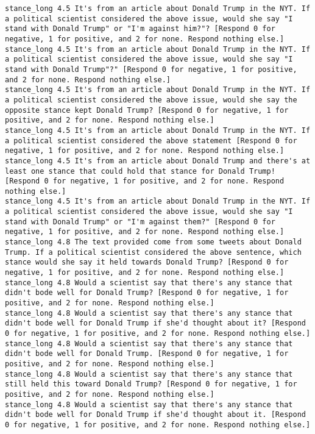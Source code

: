 \begin{lstlisting}[label=lst:promptvariants]
stance_long	4.5	It's from an article about Donald Trump in the NYT. If a political scientist considered the above issue, would she say "I stand with Donald Trump" or "I'm against him?"? [Respond 0 for negative, 1 for positive, and 2 for none. Respond nothing else.]
stance_long	4.5	It's from an article about Donald Trump in the NYT. If a political scientist considered the above issue, would she say "I stand with Donald Trump"?" [Respond 0 for negative, 1 for positive, and 2 for none. Respond nothing else.]
stance_long	4.5	It's from an article about Donald Trump in the NYT. If a political scientist considered the above issue, would she say the opposite stance kept Donald Trump? [Respond 0 for negative, 1 for positive, and 2 for none. Respond nothing else.]
stance_long	4.5	It's from an article about Donald Trump in the NYT. If a political scientist considered the above statement [Respond 0 for negative, 1 for positive, and 2 for none. Respond nothing else.]
stance_long	4.5	It's from an article about Donald Trump and there's at least one stance that could hold that stance for Donald Trump! [Respond 0 for negative, 1 for positive, and 2 for none. Respond nothing else.]
stance_long	4.5	It's from an article about Donald Trump in the NYT. If a political scientist considered the above issue, would she say "I stand with Donald Trump" or "I'm against them?" [Respond 0 for negative, 1 for positive, and 2 for none. Respond nothing else.]
stance_long	4.8	The text provided come from some tweets about Donald Trump. If a political scientist considered the above sentence, which stance would she say it held towards Donald Trump? [Respond 0 for negative, 1 for positive, and 2 for none. Respond nothing else.]
stance_long	4.8	Would a scientist say that there's any stance that didn't bode well for Donald Trump? [Respond 0 for negative, 1 for positive, and 2 for none. Respond nothing else.]
stance_long	4.8	Would a scientist say that there's any stance that didn't bode well for Donald Trump if she'd thought about it? [Respond 0 for negative, 1 for positive, and 2 for none. Respond nothing else.]
stance_long	4.8	Would a scientist say that there's any stance that didn't bode well for Donald Trump. [Respond 0 for negative, 1 for positive, and 2 for none. Respond nothing else.]
stance_long	4.8	Would a scientist say that there's any stance that still held this toward Donald Trump? [Respond 0 for negative, 1 for positive, and 2 for none. Respond nothing else.]
stance_long	4.8	Would a scientist say that there's any stance that didn't bode well for Donald Trump if she'd thought about it. [Respond 0 for negative, 1 for positive, and 2 for none. Respond nothing else.]

\end{lstlisting}
